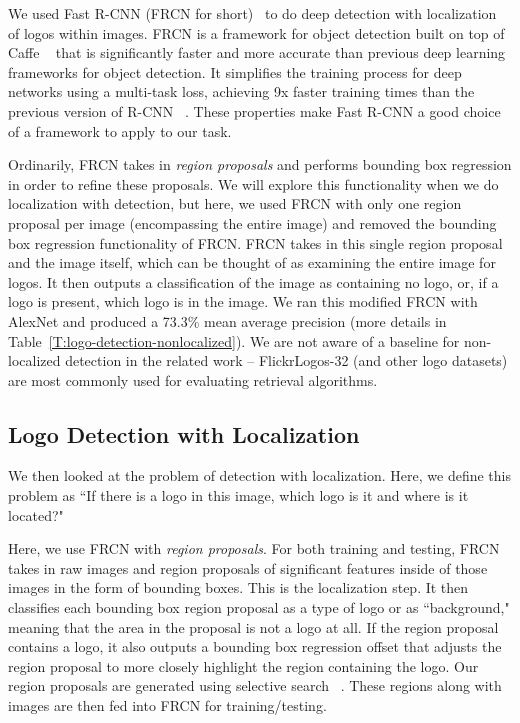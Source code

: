 \documentclass{bmvc2k}
\begin{document}
We used Fast R-CNN (FRCN for short)~\cite{FastR-CNN} to do deep detection with localization of logos within images. FRCN is a framework for object detection built on top of Caffe ~\cite{jia2014caffe} that is significantly faster and more accurate than previous deep learning frameworks for object detection. It simplifies the training process for deep networks using a multi-task loss, achieving 9x faster training times than the previous version of R-CNN ~\cite{R-CNN}. These properties make Fast R-CNN a good choice of a framework to apply to our task.

Ordinarily, FRCN takes in {\em region proposals} and performs bounding box regression in order to refine these proposals. We will explore this functionality when we do localization with detection, but here, we used FRCN with only one region proposal per image (encompassing the entire image) and removed the bounding box regression functionality of FRCN. FRCN takes in this single region proposal and the image itself, which can be thought of as examining the entire image for logos. It then outputs a classification of the image as containing no logo, or, if a logo is present, which logo is in the image. We ran this modified FRCN with AlexNet and produced a 73.3\% mean average precision (more details in Table~\ref{T:logo-detection-nonlocalized}).
We are not aware of a baseline for non-localized detection in the related work -- FlickrLogos-32 (and other logo datasets) are most commonly used for evaluating retrieval algorithms.

\FloatBarrier
\subsection{Logo Detection with Localization}
\label{sec:detection_with_localization}
We then looked at the problem of detection with localization. Here, we define this problem as ``If there is a logo in this image, which logo is it and where is it located?"

Here, we use FRCN with {\em region proposals}. 
For both training and testing, FRCN takes in raw images and region proposals of significant features inside of those images in the form of bounding boxes. 
This is the localization step. 
It then classifies each bounding box region proposal as a type of logo or as ``background," meaning that the area in the proposal is not a logo at all. 
If the region proposal contains a logo, it also outputs a bounding box regression offset that adjusts the region proposal to more closely highlight the region containing the logo. 
Our region proposals are generated using selective search ~\cite{SelectiveSearch}. 
These regions along with images are then fed into FRCN for training/testing. 
\end{document}
